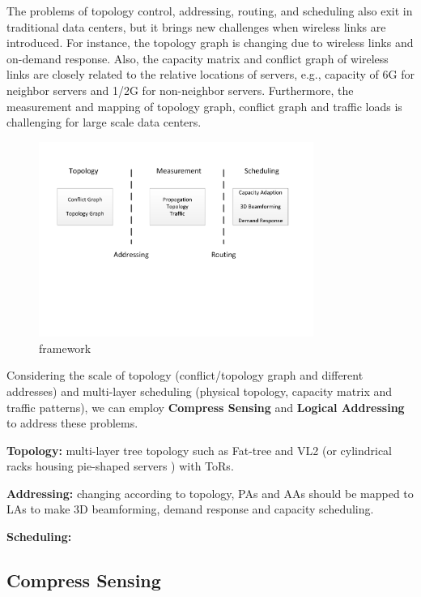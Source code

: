 \documentclass[journal,onecolumn,11pt]{IEEEtran}
\begin{document}
The problems of topology control, addressing, routing, and scheduling also exit in traditional data centers, but it brings new challenges when wireless links are introduced. For instance, the topology graph is changing due to wireless links and on-demand response. Also, the capacity matrix and conflict graph of wireless links are closely related to the relative locations of servers, e.g., capacity of 6G for neighbor servers and 1/2G for non-neighbor servers. Furthermore, the measurement and mapping of topology graph, conflict graph and traffic loads is challenging for large scale data centers.

\begin{figure}[!htp]
\centering
\includegraphics[width=0.8\textwidth]{framework.pdf}
\caption{framework}
\label{framework}
\end{figure}

Considering the scale of topology (conflict/topology graph and different addresses) and multi-layer scheduling (physical topology, capacity matrix and traffic patterns), we can employ \textbf{Compress Sensing} and \textbf{Logical Addressing} to address these problems.

\textbf{Topology:} multi-layer tree topology such as Fat-tree and VL2 (or cylindrical racks housing pie-shaped servers \cite{Shin:2012:FCW:2396556.2396560}) with ToRs.

\textbf{Addressing:} changing according to topology, PAs and AAs should be mapped to LAs to make 3D beamforming, demand response and capacity scheduling.

\textbf{Scheduling:} 


\subsection{Compress Sensing}
\end{document}
